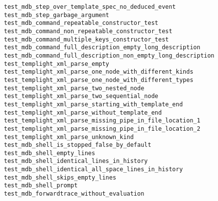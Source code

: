 \begin{description}
    \item[\texttt{test\_mdb\_step\_over\_template\_spec\_no\_deduced\_event}]
    \item[\texttt{test\_mdb\_step\_garbage\_argument}]
    \item[\texttt{test\_mdb\_command\_repeatable\_constructor\_test}]
    \item[\texttt{test\_mdb\_command\_non\_repeatable\_constructor\_test}]
    \item[\texttt{test\_mdb\_command\_multiple\_keys\_constructor\_test}]
    \item[\texttt{test\_mdb\_command\_full\_description\_empty\_long\_description}]
    \item[\texttt{test\_mdb\_command\_full\_description\_non\_empty\_long\_description}]
    \item[\texttt{test\_templight\_xml\_parse\_empty}]
    \item[\texttt{test\_templight\_xml\_parse\_one\_node\_with\_different\_kinds}]
    \item[\texttt{test\_templight\_xml\_parse\_one\_node\_with\_different\_types}]
    \item[\texttt{test\_templight\_xml\_parse\_two\_nested\_node}]
    \item[\texttt{test\_templight\_xml\_parse\_two\_sequential\_node}]
    \item[\texttt{test\_templight\_xml\_parse\_starting\_with\_template\_end}]
    \item[\texttt{test\_templight\_xml\_parse\_without\_template\_end}]
    \item[\texttt{test\_templight\_xml\_parse\_missing\_pipe\_in\_file\_location\_1}]
    \item[\texttt{test\_templight\_xml\_parse\_missing\_pipe\_in\_file\_location\_2}]
    \item[\texttt{test\_templight\_xml\_parse\_unknown\_kind}]
    \item[\texttt{test\_mdb\_shell\_is\_stopped\_false\_by\_default}]
    \item[\texttt{test\_mdb\_shell\_empty\_lines}]
    \item[\texttt{test\_mdb\_shell\_identical\_lines\_in\_history}]
    \item[\texttt{test\_mdb\_shell\_identical\_all\_space\_lines\_in\_history}]
    \item[\texttt{test\_mdb\_shell\_skips\_empty\_lines}]
    \item[\texttt{test\_mdb\_shell\_prompt}]
    \item[\texttt{test\_mdb\_forwardtrace\_without\_evaluation}]

\end{description}
